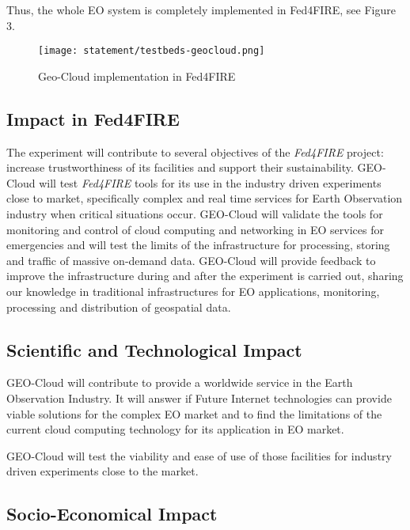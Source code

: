 Thus, the whole EO system is completely implemented in Fed4FIRE, see Figure 3.

\begin{figure}[!h]
\begin{center}
\texttt{[image: statement/testbeds-geocloud.png]}
\caption{Geo-Cloud implementation in Fed4FIRE}
\label{fig:intr-testbeds-geocloud}
\end{center}
\end{figure}




\subsection{Impact in Fed4FIRE}
The experiment will contribute to several objectives of the \emph{Fed4FIRE} project:
increase trustworthiness of its facilities and support their
sustainability. GEO-Cloud will test \emph{Fed4FIRE} tools for its use in the industry
driven experiments close to market, specifically complex and real time services
for Earth Observation industry when critical situations occur. 
GEO-Cloud will validate the tools for monitoring and control of cloud computing
and networking in EO services for emergencies and will test the limits of the
infrastructure for processing, storing and traffic of massive on-demand
data. GEO-Cloud will provide feedback to improve the infrastructure during and
after the experiment is carried out, sharing our knowledge in traditional
infrastructures for \ac{EO} applications, monitoring, processing and
distribution of geospatial data.

\subsection{Scientific and Technological Impact}

GEO-Cloud will contribute to provide a worldwide service in the Earth
Observation Industry. It will answer if Future Internet technologies can provide
viable solutions for the complex \ac{EO} market and to find the limitations of
the current cloud computing technology for its application in \ac{EO} market.
 
GEO-Cloud will test the viability and ease of use of those facilities for
industry driven experiments close to the market.

\subsection{Socio-Economical Impact}

